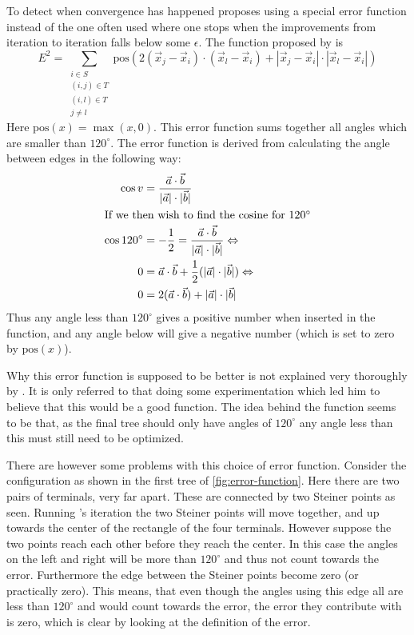 To detect when convergence has happened \citeauthor{smith1992} proposes using a special
error function instead of the one often used where one stops when the
improvements from iteration to iteration falls below some $\epsilon$. The
function proposed by \citeauthor{smith1992} is
%
\begin{equation}
  E^2 = \sum_{
    \begin{array}{c} i \in S \\ (i,j) \in T \\ (i,l) \in T \\ j \ne l
    \end{array}} \text{pos} (2 (\vec x_j - \vec x_i) \cdot (\vec x_l - \vec x_i)
+ | \vec x_j - \vec x_i | \cdot | \vec x_l - \vec x_i |)
\end{equation}
%
Here $\text{pos}(x) = \max(x, 0)$. This error function sums together all angles which
are smaller than $120^{\circ}$. The error function is derived from calculating
the angle between edges in the following way:
%
\begin{align}
  \cos v & = \frac{\vec a \cdot \vec b}
    {|\vec a| \cdot |\vec b|}                 \\
  \intertext{If we then wish to find the cosine for $120^{\circ}$}
  \cos 120^{\circ}
         & = -\frac{1}{2} = \frac{\vec a \cdot \vec b}
    {|\vec a| \cdot |\vec b|} \Leftrightarrow \\
  0      & = \vec a \cdot \vec b + \frac{1}{2}
    (|\vec a| \cdot |\vec b|) \Leftrightarrow \\
  0      & = 2 (\vec a \cdot \vec b) + |\vec a| \cdot |\vec b|
\end{align}
%
Thus any angle less than $120^{\circ}$ gives a positive number when inserted in
the function, and any angle below will give a negative number (which is set to
zero by $\text{pos}(x)$).

Why this error function is supposed to be better is not explained very
thoroughly by \citeauthor{smith1992}. It is only referred to that doing some
experimentation which led him to believe that this would be a good function. The
idea behind the function seems to be that, as the final tree should only have
angles of $120^{\circ}$ any angle less than this must still need to be
optimized.

There are however some problems with this choice of error function. Consider
the configuration as shown in the first tree of \cref{fig:error-function}. Here
there are two pairs of terminals, very far apart. These are connected by two
Steiner points as seen. Running \citeauthor{smith1992}'s iteration the two Steiner points will
move together, and up towards the center of the rectangle of the four
terminals. However suppose the two points reach each other before they reach
the center. In this case the angles on the left and right will be more than
$120^{\circ}$ and thus not count towards the error. Furthermore the edge
between the Steiner points become zero (or practically zero). This means, that
even though the angles using this edge all are less than $120^{\circ}$ and would
count towards the error, the error they contribute with is zero, which is clear
by looking at the definition of the error.

